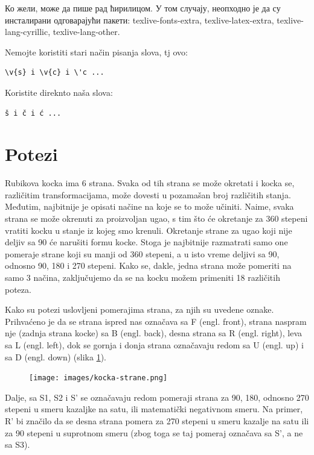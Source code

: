 \documentclass[a4paper]{article}
\begin{document}
Ко жели, може да пише рад ћирилицом. У том случају, неопходно је да су инсталирани одговарајући пакети: texlive-fonts-extra, texlive-latex-extra, texlive-lang-cyrillic, texlive-lang-other. 

Nemojte koristiti stari način pisanja slova, tj ovo:
\begin{verbatim}
\v{s} i \v{c} i \'c ...
\end{verbatim}
Koristite direknto naša slova:	
\begin{verbatim}
š i č i ć ... 
\end{verbatim}


\section{Potezi}	
\label{sec:potezi}

Rubikova kocka ima 6 strana. Svaka od tih strana se može okretati i kocka se, različitim transformacijama, može dovesti u pozamašan broj različitih stanja. Međutim, najbitnije je opisati načine na koje se to može učiniti. Naime, svaka strana se može okrenuti za proizvoljan ugao, s tim što će okretanje za 360 stepeni vratiti kocku u stanje iz kojeg smo krenuli. Okretanje strane za ugao koji nije deljiv sa 90 će narušiti formu kocke. Stoga je najbitnije razmatrati samo one pomeraje strane koji su manji od 360 stepeni, a u isto vreme deljivi sa 90, odnosno 90, 180 i 270 stepeni. Kako se, dakle, jedna strana može pomeriti na samo 3 načina, zaključujemo da se na kocku možem primeniti 18 različitih poteza.

Kako su potezi uslovljeni pomerajima strana, za njih su uvedene oznake. Prihvaćeno je da se strana ispred nas označava sa F (engl. front), strana naspram nje (zadnja strana kocke) sa B (engl. back), desna strana sa R (engl. right), leva sa L (engl. left), dok se gornja i donja strana označavaju redom sa U (engl. up) i sa D (engl. down) (slika \ref{fig:stranekocke}).

\begin{figure}
        \centering\texttt{[image: images/kocka-strane.png]} 
        \caption{}
        \label{fig:stranekocke}
\end{figure}

Dalje, sa S1, S2 i S' se označavaju redom pomeraji strana za 90, 180, odnosno 270 stepeni u smeru kazaljke na satu, ili matematički negativnom smeru. Na primer, R' bi značilo da se desna strana pomera za 270 stepeni u smeru kazalje na satu ili za 90 stepeni u suprotnom smeru (zbog toga se taj pomeraj označava sa S', a ne sa S3).
\end{document}
